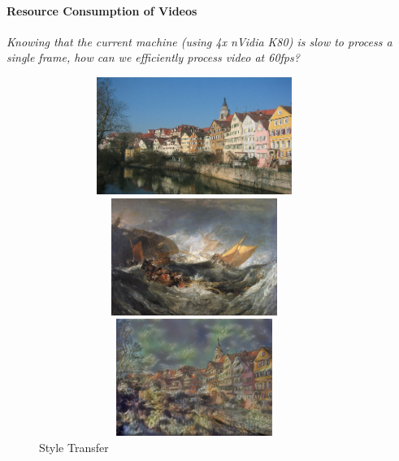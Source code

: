 \documentclass{article}
\begin{document}
\paragraph{Resource Consumption of Videos} \textit{Knowing that the current
machine (using 4x nVidia K80) is slow to process a single frame, how can we
efficiently process video at 60fps?}








\appendix

\begin{figure}[ht]
\centering
\caption{Style Transfer}

    \begin{minipage}{0.45\linewidth}
    \centering
    \includegraphics[width=0.9\textwidth,height=1.5in]{img/content/tubingen}
    \end{minipage}

\medskip

    \begin{minipage}{0.45\linewidth}
    \centering
    \includegraphics[width=0.9\textwidth,height=1.5in]{img/artworks/the-shipwreck-of-the-minotaur}
    \end{minipage}
    \begin{minipage}{0.45\linewidth}
    \centering
    \includegraphics[width=0.9\textwidth,height=1.5in]{img/transfer/the-shipwreck-of-the-minotaur}
    \end{minipage}


\end{figure}
\end{document}
